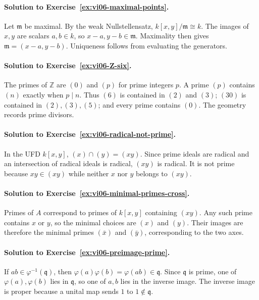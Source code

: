 \paragraph{Solution to Exercise~\ref{ex:vi06-maximal-points}.}
Let \(\mathfrak m\) be maximal.  By the weak Nullstellensatz,
\(k[x,y]/\mathfrak m\cong k\).  The images of \(x,y\) are scalars \(a,b\in k\), so
\(x-a,y-b\in\mathfrak m\).  Maximality then gives
\(\mathfrak m=(x-a,y-b)\).  Uniqueness follows from evaluating the generators.

\paragraph{Solution to Exercise~\ref{ex:vi06-Z-six}.}
The primes of \(\mathbb Z\) are \((0)\) and \((p)\) for prime integers \(p\).  A prime
\((p)\) contains \((n)\) exactly when \(p\mid n\).  Thus \((6)\) is contained in \((2)\)
and \((3)\); \((30)\) is contained in \((2),(3),(5)\); and every prime contains \((0)\).
The geometry records prime divisors.

\paragraph{Solution to Exercise~\ref{ex:vi06-radical-not-prime}.}
In the UFD \(k[x,y]\), \((x)\cap(y)=(xy)\).  Since prime ideals are radical and an
intersection of radical ideals is radical, \((xy)\) is radical.  It is not prime because
\(xy\in(xy)\) while neither \(x\) nor \(y\) belongs to \((xy)\).

\paragraph{Solution to Exercise~\ref{ex:vi06-minimal-primes-cross}.}
Primes of \(A\) correspond to primes of \(k[x,y]\) containing \((xy)\).  Any such prime
contains \(x\) or \(y\), so the minimal choices are \((x)\) and \((y)\).  Their images are
therefore the minimal primes \((\bar x)\) and \((\bar y)\), corresponding to the two axes.

\paragraph{Solution to Exercise~\ref{ex:vi06-preimage-prime}.}
If \(ab\in\varphi^{-1}(\mathfrak q)\), then
\(\varphi(a)\varphi(b)=\varphi(ab)\in\mathfrak q\).  Since \(\mathfrak q\) is prime,
one of \(\varphi(a),\varphi(b)\) lies in \(\mathfrak q\), so one of \(a,b\) lies in the
inverse image.  The inverse image is proper because a unital map sends \(1\) to \(1\notin\mathfrak q\).

